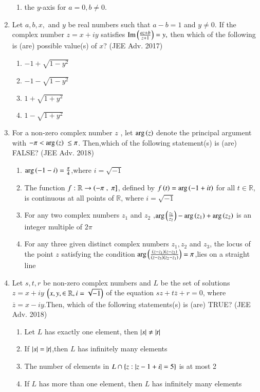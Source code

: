 \documentclass[journal]{IEEEtran}
\begin{document}
\begin{enumerate}
\begin{enumerate}
    \item the $y$-axis for $a=0, b \ne 0$.
    \end{enumerate}
\item Let $a,b,x,$ and $y$ be real numbers such that $a-b=1$ and $y \ne 0$. If the complex number $z=x+iy$ satisfies $\mathrm{Im}\left(\frac{az+b}{z+1}\right)=y,$ then which of the following is (are) possible value(s) of $x$? \hfill (JEE Adv. 2017)
\begin{enumerate}
    \item $-1+\sqrt{1-y^2}$
    \item $-1-\sqrt{1-y^2}$
    \item $1+\sqrt{1+y^2}$
    \item $1-\sqrt{1+y^2}$
    \end{enumerate}
    \item For a non-zero complex number $z$ , let $\mathrm{arg}\left(z\right)$ denote the principal argument with $-\pi < \mathrm{arg}\left(z\right)\ \leq \pi$. Then,which of the following statement(s) is (are) FALSE?  \hfill (JEE Adv. 2018)
    \begin{enumerate}
    \item $\mathrm{arg}\left(-1-i\right)=\frac{\pi}{4}$,where $i=\sqrt{-1}$
    \item The function $f:\mathbb{R} \to \left(-\pi\right., {}\left.\pi\right]$, defined by $f\left(t\right)=\mathrm{arg}\left(-1+it\right)$ for all $t \in \mathbb{R}$, is continuous at all points of $\mathbb{R}$, where $i=\sqrt{-1}$
    \item For any two complex numbers $z_1$ and $z_2$ ,$\mathrm{arg}\left(\frac{z_1}{z_2}\right)-\mathrm{arg}\left(z_1\right)+\mathrm{arg}\left(z_2\right)$ is an integer multiple of $2\pi$
    \item For any three given distinct complex numbers $z_1,z_2$ and $z_3$, the locus of the point $z$ satisfying the condition $\mathrm{arg} \left(\frac{\left(z-z_1\right)\left(z-z_2\right)}{\left(z-z_3\right)\left(z_2-z_1\right)}\right)=\pi$,lies on a straight line
    \end{enumerate}
    \item Let $s,t,r$ be non-zero complex numbers and $L$ be the set of solutions  $z=x+iy$ $\left(x,y, \in \mathbb{R},i=\sqrt{-1}\right)$ of the equation $sz+t\overline{z}+r=0$, where $\overline{z}=x-iy$.Then, which of the following statements(s) is (are) TRUE? \hfill (JEE Adv. 2018)
    \begin{enumerate}
    \item Let $L$ has exactly one element, then $\left\vert s\right\vert \ne \left\vert t\right\vert$
    \item If $\left\vert s\right\vert=\left\vert t\right\vert$,then $L$ has infinitely many elements 
    \item The number of elements in $L \cap \left\{z:\left\vert z-1+i\right\vert=5\right\}$ is at most 2
    \item If $L$  has more than one element, then $L$ has infinitely many elements 
    \end{enumerate}
    \end{enumerate}
\end{document}
